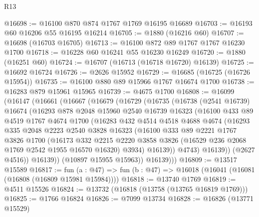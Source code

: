 \begin{lexlean}{R13}
\begin{coremodule}
@16698 := @16100 @870 @874 @1767 @1769 @16195 @16689
@16703 := @16193 @60 @16206 @55 @16195 @16214
@16705 := @1880 (@16216 @60)
@16707 := @16698 (@16703 @16705)
@16713 := @16100 @872 @89 @1767 @1767 @16230 @1700
@16718 := @16228 @60 @16241 @55 @16230 @16249
@16720 := @1880 (@16251 @60)
@16724 := @16707 (@16713 (@16718 @16720) @16139)
@16725 := @16692 @16724
@16726 := @2626 @15952
@16729 := @16685 (@16725 (@16726 @15954))
@16735 := @16100 @880 @89 @15966 @1767 @16674 @1700
@16738 := @16283 @879 @15961 @15965
@16739 := @4675 @1700
@16808 := @16099
    (@16147
      (@16661
        (@16667
          (@16679
            (@16729
              (@16735
                (@16738
                  (@2541 @16739)
                  @16674
                  (@16293
                    @878
                    @2048
                    @15960
                    @2540
                    @16739
                    @16323
                    (@16100
                      @433
                      @89
                      @4519
                      @1767
                      @4674
                      @1700
                      (@16283
                        @432
                        @4514
                        @4518
                        @4688
                        @4674
                        (@16293
                          @335
                          @2048
                          @2223
                          @2540
                          @3828
                          @16323
                          (@16100
                            @333
                            @89
                            @2221
                            @1767
                            @3826
                            @1700
                            (@16173
                              @332
                              @2215
                              @2220
                              @3858
                              @3826
                              (@16529 @236 @2068 @1769 @2542 @1955 @16570 @16320)
                              @3934)
                            @16139))
                        @4743)
                      @16139))
                  (@2627 @4516))
                @16139))
            (@10897 @15955 @15963))
          @16139)))
@16809 := @13517 @15589
@16817 := fun (a : @47) => fun (b : @47) => @16018 (@16041 (@16081 (@16808 (@16809 @15981 @15984))))
@16818 := @13740 @1769
@16819 := @4511 @15526
@16824 := @13732 (@16818 (@13758 (@13765 @16819 @1769)))
@16825 := @1766 @16824
@16826 := @7099 @13734
@16828 := @16826 (@13771 @15529)

\end{coremodule}
\end{lexlean}
